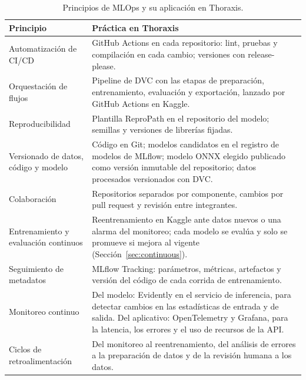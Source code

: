 \begin{table}[htbp]
    \centering
    \caption{Principios de MLOps y su aplicación en Thoraxis.}\label{tab:mlops}
    \small
    \begin{tabularx}{\textwidth}{>{\raggedright\arraybackslash}p{4.4cm}
                                 >{\raggedright\arraybackslash}X}
        \toprule
        Principio & Práctica en Thoraxis \\
        \midrule
        Automatización de CI/CD & GitHub Actions en cada repositorio: lint,
            pruebas y compilación en cada cambio; versiones con
            release-please. \\
        Orquestación de flujos & Pipeline de DVC con las etapas de
            preparación, entrenamiento, evaluación y exportación, lanzado por
            GitHub Actions en Kaggle. \\
        Reproducibilidad & Plantilla ReproPath en el repositorio del modelo;
            semillas y versiones de librerías fijadas. \\
        Versionado de datos, código y modelo & Código en Git; modelos
            candidatos en el registro de modelos de MLflow; modelo ONNX elegido
            publicado como versión inmutable del repositorio; datos procesados
            versionados con DVC. \\
        Colaboración & Repositorios separados por componente, cambios por pull
            request y revisión entre integrantes. \\
        Entrenamiento y evaluación continuos & Reentrenamiento en Kaggle ante
            datos nuevos o una alarma del monitoreo; cada modelo se evalúa y
            solo se promueve si mejora al vigente
            (Sección~\ref{sec:continuous}). \\
        Seguimiento de metadatos & MLflow Tracking: parámetros, métricas,
            artefactos y versión del código de cada corrida de
            entrenamiento. \\
        Monitoreo continuo & Del modelo: Evidently en el servicio de
            inferencia, para detectar cambios en las estadísticas de entrada y
            de salida. Del aplicativo: OpenTelemetry y Grafana, para la
            latencia, los errores y el uso de recursos de la API. \\
        Ciclos de retroalimentación & Del monitoreo al reentrenamiento, del
            análisis de errores a la preparación de datos y de la revisión
            humana a los datos. \\
        \bottomrule
    \end{tabularx}
\end{table}

